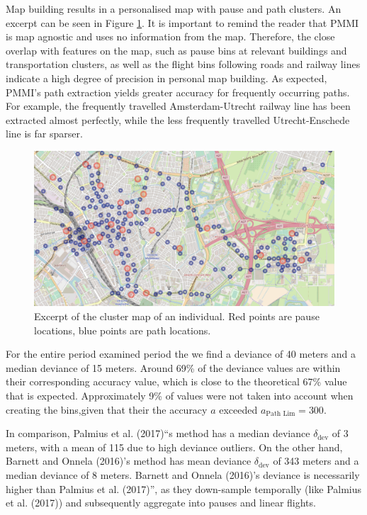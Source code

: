 \documentclass[man]{apa6}
\theoremstyle{definition}
\theoremstyle{definition}
\theoremstyle{definition}
\theoremstyle{remark}
\begin{document}
Map building results in a personalised map with pause and path clusters.
An excerpt can be seen in Figure \ref{fig:mapClusterMap}. It is
important to remind the reader that PMMI is map agnostic and uses no
information from the map. Therefore, the close overlap with features on
the map, such as pause bins at relevant buildings and transportation
clusters, as well as the flight bins following roads and railway lines
indicate a high degree of precision in personal map building. As
expected, PMMI's path extraction yields greater accuracy for frequently
occurring paths. For example, the frequently travelled Amsterdam-Utrecht
railway line has been extracted almost perfectly, while the less
frequently travelled Utrecht-Enschede line is far sparser.

\begin{figure}
\includegraphics[width=1\linewidth]{img/mapClusterMap} \caption{Excerpt of the cluster map of an individual. Red points are pause locations, blue points are path locations.}\label{fig:mapClusterMap}
\end{figure}

For the entire period examined period the we find a deviance of 40
meters and a median deviance of 15 meters. Around 69\% of the deviance
values are within their corresponding accuracy value, which is close to
the theoretical 67\% value that is expected. Approximately 9\% of values
were not taken into account when creating the bins,given that their the
accuracy \(a\) exceeded \(a_{\text{Path Lim}} = 300\).

In comparison, Palmius et al. (2017)\enquote{s method has a median
deviance \(\delta_{\text{dev}}\) of 3 meters, with a mean of 115 due to
high deviance outliers. On the other hand, Barnett and Onnela (2016)'s
method has mean deviance \(\delta_{\text{dev}}\) of 343 meters and a
median deviance of 8 meters. Barnett and Onnela (2016)'s deviance is
necessarily higher than Palmius et al. (2017)}, as they down-sample
temporally (like Palmius et al. (2017)) and subsequently aggregate into
pauses and linear flights.
\end{document}

